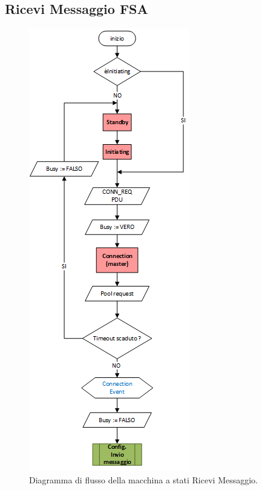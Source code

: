\subsection{Ricevi Messaggio FSA}
\label{apx:ricevi_fsa}
\begin{figure}[!h]
	\centering
	\includegraphics[height= 0.78\textheight]{Images/diagrammi_fsa/Ricevi_msg_fsa}
	\caption[Ricevi Messaggio fsa]{Diagramma di flusso della macchina a stati Ricevi Messaggio.}
	\label{fig:Ricevi_msg_fsa}
\end{figure}

